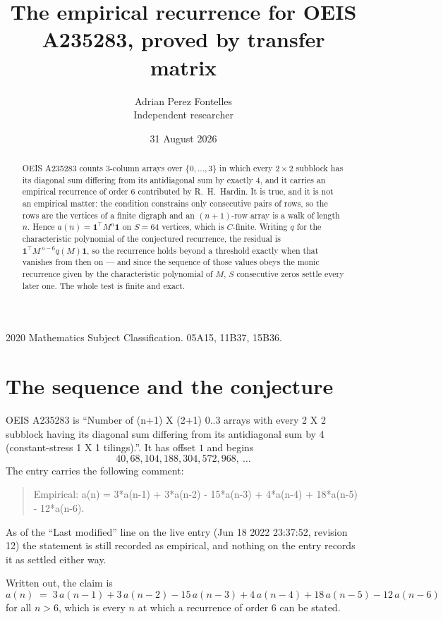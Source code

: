 \documentclass[11pt,a4paper]{article}
\title{The empirical recurrence for OEIS A235283, proved by transfer matrix}
\author{Adrian Perez Fontelles\\ \small Independent researcher}
\date{31 August 2026}
\theoremstyle{plain}
\theoremstyle{definition}
\begin{document}
\maketitle

\begin{abstract}
OEIS A235283 counts $3$-column arrays over $\{0,\dots,3\}$ in which every
$2\times2$ subblock has its diagonal sum differing from its antidiagonal sum by
exactly $4$, and it
carries an empirical recurrence of order $6$ contributed by R.~H.~Hardin. It is true,
and it is not an empirical matter: the condition constrains only consecutive pairs of rows,
so the rows are the vertices of a finite digraph and an $(n+1)$-row array is a walk of
length $n$. Hence $a(n)=\mathbf{1}^{\!\top}M^{n}\mathbf{1}$ on $S=64$ vertices, which
is $C$-finite. Writing $q$ for the characteristic polynomial of the conjectured recurrence,
the residual is $\mathbf{1}^{\!\top}M^{\,n-6}q(M)\mathbf{1}$, so the recurrence
holds beyond a threshold exactly when that vanishes from then on --- and since the sequence
of those values obeys the monic recurrence given by the characteristic polynomial of $M$,
$S$ consecutive zeros settle every later one. The whole test is finite and exact.
\end{abstract}

\noindent\small 2020 Mathematics Subject Classification. 05A15, 11B37, 15B36.\normalsize

\section{The sequence and the conjecture}

OEIS A235283 is ``Number of (n+1) X (2+1) 0..3 arrays with every 2 X 2 subblock having its diagonal sum differing from its antidiagonal sum by 4 (constant-stress 1 X 1 tilings).''. It has offset
$1$ and begins
\[
40, 68, 104, 188, 304, 572, 968,\ \dots
\]
The entry carries the following comment:
\begin{quote}\small
Empirical: a(n) = 3*a(n-1) + 3*a(n-2) - 15*a(n-3) + 4*a(n-4) + 18*a(n-5) - 12*a(n-6).
\end{quote}
As of the ``Last modified'' line on the live entry (Jun 18 2022 23:37:52, revision 12) the statement is
still recorded as empirical, and nothing on the entry records it as settled either way.

Written out, the claim is
\begin{equation}\label{eq:conj}
a(n)\;=\;3\,a(n-1) + 3\,a(n-2) - 15\,a(n-3) + 4\,a(n-4) + 18\,a(n-5) - 12\,a(n-6)
\end{equation}
for all $n>6$, which is every $n$ at which a recurrence of order $6$ can be
stated.
\end{document}
